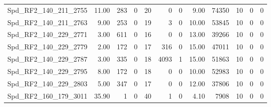 \begin{longtable}[c]{@{}lrrrrrrrrrrr@{}}
Spd\_RF2\_140\_211\_2755     & 11.00                  & 283                     & 0                       & 20                     & 0                       & 0                       & 9.00                    & 74350                    & 10                       & 0                        & 0                        \\
Spd\_RF2\_140\_211\_2763     & 9.00                   & 253                     & 0                       & 19                     & 3                       & 0                       & 10.00                   & 53845                    & 10                       & 0                        & 0                        \\
Spd\_RF2\_140\_229\_2771     & 3.00                   & 611                     & 0                       & 16                     & 0                       & 0                       & 13.00                   & 39266                    & 10                       & 0                        & 0                        \\
Spd\_RF2\_140\_229\_2779     & 2.00                   & 172                     & 0                       & 17                     & 316                     & 0                       & 15.00                   & 47011                    & 10                       & 0                        & 0                        \\
Spd\_RF2\_140\_229\_2787     & 3.00                   & 335                     & 0                       & 18                     & 4093                    & 1                       & 15.00                   & 51863                    & 10                       & 0                        & 0                        \\
Spd\_RF2\_140\_229\_2795     & 8.00                   & 172                     & 0                       & 18                     & 0                       & 0                       & 10.00                   & 52983                    & 10                       & 0                        & 0                        \\
Spd\_RF2\_140\_229\_2803     & 5.00                   & 347                     & 0                       & 17                     & 0                       & 0                       & 12.00                   & 37806                    & 10                       & 0                        & 0                        \\
Spd\_RF2\_160\_179\_3011     & 35.90                  & 1                       & 0                       & 40                     & 1                       & 0                       & 4.10                    & 7908                     & 10                       & 0                        & 0                        \\

\end{longtable}
